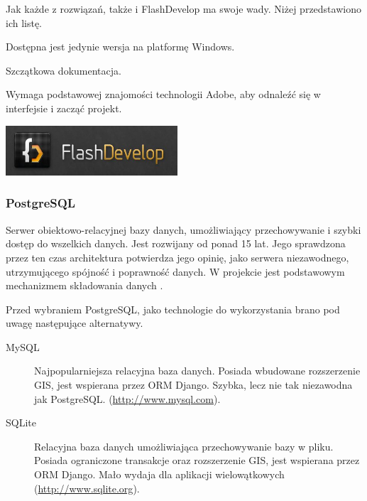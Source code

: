 Jak każde z rozwiązań, także i FlashDevelop ma swoje wady. Niżej przedstawiono ich listę.
\begin{packed_item}
    \item{Dostępna jest jedynie wersja na platformę Windows.}
    \item{Szczątkowa dokumentacja.}
    \item{Wymaga podstawowej znajomości technologii Adobe, aby odnaleźć się w interfejsie i zacząć projekt.}
\end{packed_item}

\begin{center}
    \includegraphics[width=0.48\textwidth]{img/logos/flashdevelop.jpg}
\end{center}

\newpage
\subsubsection{PostgreSQL}
Serwer obiektowo-relacyjnej bazy danych, umożliwiający przechowywanie i szybki dostęp do wszelkich danych. Jest rozwijany od ponad 15 lat. Jego sprawdzona przez ten czas architektura potwierdza jego opinię, jako serwera niezawodnego, utrzymującego spójność i poprawność danych. W projekcie jest podstawowym mechanizmem składowania danych \cite{PostgreSQL}.

Przed wybraniem PostgreSQL, jako technologie do wykorzystania brano pod uwagę następujące alternatywy.
\begin{description}
    \item[MySQL] Najpopularniejsza relacyjna baza danych. Posiada wbudowane rozszerzenie GIS, jest wspierana przez ORM Django. Szybka, lecz nie tak niezawodna jak PostgreSQL.  (\url{http://www.mysql.com}).
    \item[SQLite] Relacyjna baza danych umożliwiająca przechowywanie bazy w pliku. Posiada ograniczone transakcje oraz rozszerzenie GIS, jest wspierana przez ORM Django. Mało wydaja dla aplikacji wielowątkowych \\(\url{http://www.sqlite.org}).
\end{description}

